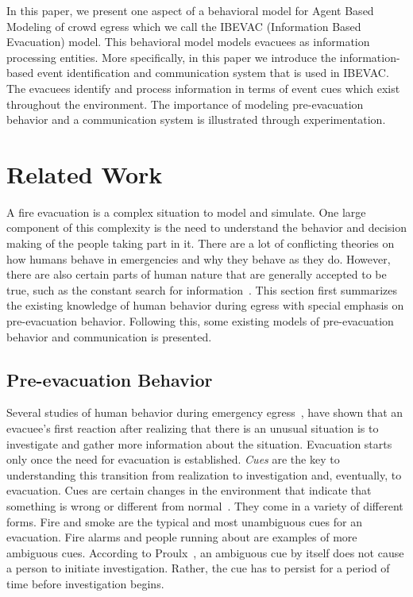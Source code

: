 In this paper, we present one aspect of a behavioral model for Agent Based Modeling of crowd egress which we call the IBEVAC (Information Based Evacuation) model. This behavioral model models evacuees as information processing entities. More specifically, in this paper we introduce the information-based event identification and communication system that is used in IBEVAC. The evacuees identify and process information in terms of event cues which exist throughout the environment. The importance of modeling pre-evacuation behavior and a communication system is illustrated through experimentation.

\section{Related Work}
\label{LitRev}


A fire evacuation is a complex situation to model and simulate. One large component of this complexity is the need to understand the behavior and decision making of the people taking part in it. There are a lot of conflicting theories on how humans behave in emergencies and why they behave as they do. However, there are also certain parts of human nature that are generally accepted to be true, such as the constant search for information~\cite{Proulx:2003tc,Tong:1985wn,Ozel:2001tn,Sime:1983uy}. This section first summarizes the existing knowledge of human behavior during egress with special emphasis on pre-evacuation behavior. Following this, some existing models of pre-evacuation behavior and communication is presented.

\subsection{Pre-evacuation Behavior}
\label{PreEvacuationBehavior}

Several studies of human behavior during emergency egress~\cite{Kuligowski:2005tt,Ozel:2001tn,Proulx:2007ul}, have shown that an evacuee's first reaction after realizing that there is an unusual situation is to investigate and gather more information about the situation. Evacuation starts only once the need for evacuation is established. \emph{Cues} are the key to understanding this transition from realization to investigation and, eventually, to evacuation. Cues are certain changes in the environment that indicate that something is wrong or different from normal~\cite{Sime:1983uy}. They come in a variety of different forms. Fire and smoke are the typical and most unambiguous cues for an evacuation. Fire alarms and people running about are examples of more ambiguous cues. According to Proulx~\cite{Proulx:2007ul}, an ambiguous cue by itself does not cause a person to initiate investigation. Rather, the cue has to persist for a period of time before investigation begins.

